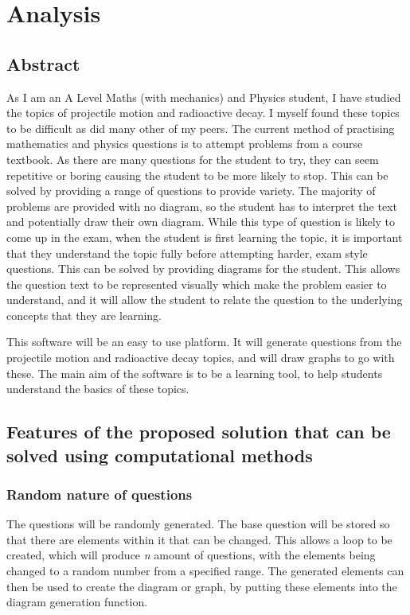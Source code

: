 \chapter{Analysis}
\section{Abstract}
As I am an A Level Maths (with mechanics) and Physics student, I have studied the topics of projectile motion and radioactive decay. I myself found these topics to be difficult as did many other of my peers. The current method of practising mathematics and physics questions is to attempt problems from a course textbook. As there are many questions for the student to try, they can seem repetitive or boring causing the student to be more likely to stop. This can be solved by providing a range of questions to provide variety. The majority of problems are provided with no diagram, so the student has to interpret the text and potentially draw their own diagram. While this type of question is likely to come up in the exam, when the student is first learning the topic, it is important that they understand the topic fully before attempting harder, exam style questions. This can be solved by providing diagrams for the student. This allows the question text to be represented visually which make the problem easier to understand, and it will allow the student to relate the question to the underlying concepts that they are learning.

This software will be an easy to use platform. It will generate questions from the projectile motion and radioactive decay topics, and will draw graphs to go with these. The main aim of the software is to be a learning tool, to help students understand the basics of these topics.
\section{Features of the proposed solution that can be solved using computational methods}
\subsection{Random nature of questions}
The questions will be randomly generated. The base question will be stored so that there are elements within it that can be changed. This allows a loop to be created, which will produce \textit{n} amount of questions, with the elements being changed to a random number from a specified range. The generated elements can then be used to create the diagram or graph, by putting these elements into the diagram generation function.
